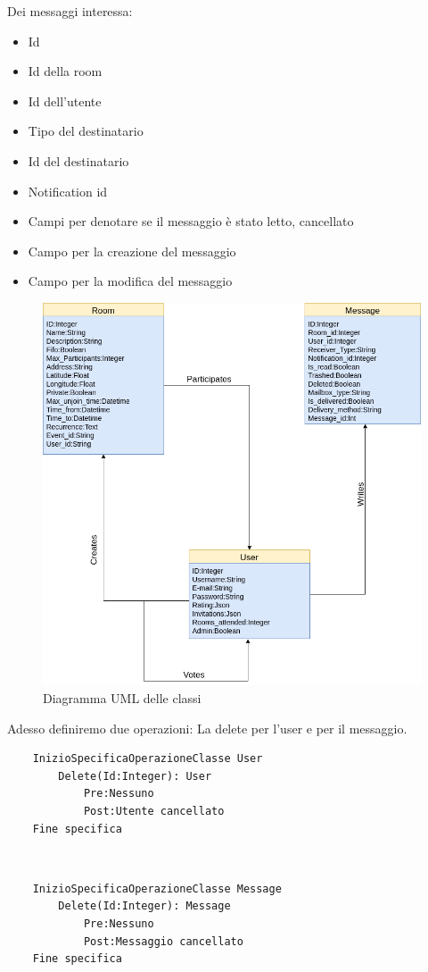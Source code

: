 Dei messaggi interessa:
\begin{itemize}
	\item Id
	\item Id della room
	\item Id dell'utente
	\item Tipo del destinatario
	\item Id del destinatario
	\item Notification id
	\item Campi per denotare se il messaggio è stato letto, cancellato
	\item Campo per la creazione del messaggio
	\item Campo per la modifica del messaggio
\end{itemize}
\begin{figure}[H]
	\centering
	\includegraphics[width=\textwidth]{./media/UML.png}
	\caption{Diagramma UML delle classi}
\end{figure}

Adesso definiremo due operazioni: La delete per l'user e per il messaggio.

\begin{lstlisting}
	InizioSpecificaOperazioneClasse User
		Delete(Id:Integer): User
			Pre:Nessuno
			Post:Utente cancellato
	Fine specifica
\end{lstlisting}
\\
\begin{lstlisting}
	InizioSpecificaOperazioneClasse Message
		Delete(Id:Integer): Message
			Pre:Nessuno
			Post:Messaggio cancellato
	Fine specifica
\end{lstlisting}

